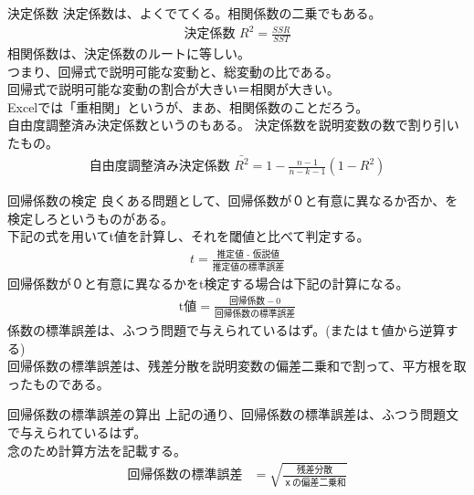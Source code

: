 \documentclass[dvipdfmx,autodetect-engine, unicode, 10pt, aspectratio=169]{beamer}
\begin{document}
 \begin{frame}{決定係数}
    決定係数は、よくでてくる。相関係数の二乗でもある。 \\
    \begin{align*}
        \text{決定係数 } R^2= \frac{SSR}{SST}
    \end{align*}
    相関係数は、決定係数のルートに等しい。\\
    つまり、回帰式で説明可能な変動と、総変動の比である。\\
    回帰式で説明可能な変動の割合が大きい＝相関が大きい。\\
    Excelでは「重相関」というが、まあ、相関係数のことだろう。 \\
    自由度調整済み決定係数というのもある。 決定係数を説明変数の数で割り引いたもの。
    \begin{align*}
        \text{自由度調整済み決定係数 }\bar{R^2} = 1 - \frac{n-1}{n-k-1}\left(1-R^2\right)
    \end{align*}
\end{frame}

\begin{frame}{回帰係数の検定}
    良くある問題として、回帰係数が０と有意に異なるか否か、を検定しろというものがある。 \\
    下記の式を用いてt値を計算し、それを閾値と比べて判定する。
    \begin{align*}
        t = \frac{\text{推定値 - 仮説値}}{{\text{推定値の標準誤差}}}
    \end{align*}
    回帰係数が０と有意に異なるかをt検定する場合は下記の計算になる。
    \begin{align*}
        \text{t値} = \frac{\text{回帰係数} - 0}{\text{回帰係数の標準誤差}}
    \end{align*}
    係数の標準誤差は、ふつう問題で与えられているはず。(またはｔ値から逆算する) \\
    回帰係数の標準誤差は、残差分散を説明変数の偏差二乗和で割って、平方根を取ったものである。
    
\end{frame}

\begin{frame}{回帰係数の標準誤差の算出}
    上記の通り、回帰係数の標準誤差は、ふつう問題文で与えられているはず。\\
    念のため計算方法を記載する。\\
    \begin{align*}
        \text{回帰係数の標準誤差} &= \sqrt{\frac{\text{残差分散}}{{\text{ｘの偏差二乗和}}}} \\
    \end{align*}
\end{frame}
\end{document}
